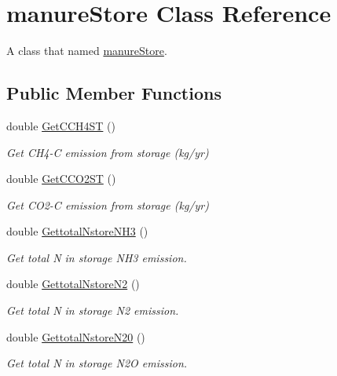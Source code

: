 \hypertarget{classmanure_store}{}\section{manure\+Store Class Reference}
\label{classmanure_store}


A class that named \mbox{\hyperlink{classmanure_store}{manure\+Store}}.  


\subsection*{Public Member Functions}
\begin{DoxyCompactItemize}
\item 
double \mbox{\hyperlink{classmanure_store_aee4bfa3be452102d08a826e07e396ac5}{Get\+C\+C\+H4\+ST}} ()
\begin{DoxyCompactList}\small\item\em Get C\+H4-\/C emission from storage (kg/yr) \end{DoxyCompactList}\item 
double \mbox{\hyperlink{classmanure_store_a33e4a1b2f4613fcfaa3b6f874acab8b4}{Get\+C\+C\+O2\+ST}} ()
\begin{DoxyCompactList}\small\item\em Get C\+O2-\/C emission from storage (kg/yr) \end{DoxyCompactList}\item 
double \mbox{\hyperlink{classmanure_store_a9ed01f678a77c1eb6223a345cd03d692}{Gettotal\+Nstore\+N\+H3}} ()
\begin{DoxyCompactList}\small\item\em Get total N in storage N\+H3 emission. \end{DoxyCompactList}\item 
double \mbox{\hyperlink{classmanure_store_ae7bc563816e8632a495a39eaca93735f}{Gettotal\+Nstore\+N2}} ()
\begin{DoxyCompactList}\small\item\em Get total N in storage N2 emission. \end{DoxyCompactList}\item 
double \mbox{\hyperlink{classmanure_store_a60fd8ec9acb19e7139b9ad47fd5cc351}{Gettotal\+Nstore\+N20}} ()
\begin{DoxyCompactList}\small\item\em Get total N in storage N2O emission. \end{DoxyCompactList}\item 

\end{DoxyCompactItemize}
